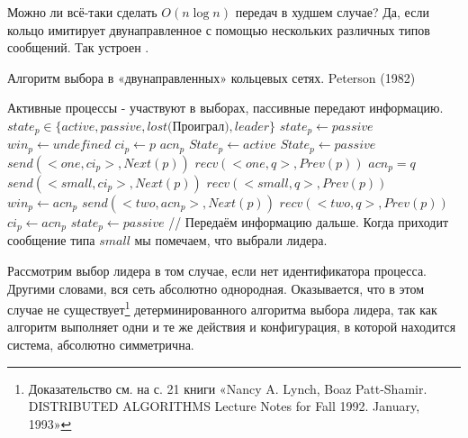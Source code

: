 Можно ли всё-таки сделать $O(n\log n)$ передач в худшем случае? Да, если кольцо имитирует двунаправленное с помощью нескольких различных типов сообщений. Так устроен .
\begin{algorithm}
\caption{Алгоритм выбора в «двунаправленных» кольцевых сетях. Peterson (1982)}
\label{algPeterson_leader}
\begin{algorithmic}
\State Активные процессы - участвуют в выборах, пассивные передают информацию. 
\State $state_p \in \{active, passive, lost\text{(Проиграл)}, leader\}$ 
\State $state_p \gets passive$
\State $win_p \gets undefined$ 
\State $ci_p \gets p$ 
\State $acn_p$ 
    \State $State_p \gets active$
\Else 
    \State $State_p \gets passive$
\EndIf
{}
    \State $send(<one, ci_p>, Next(p))$ 
    \State $recv(<one, q>, Prev(p))$
    \State $acn_p = q$
     
        \State $send(<small, ci_p>, Next(p))$ 
        \State $recv(<small, q>, Prev(p))$ 
        \State $win_p \gets acn_p$
    \Else {}
        \State $send(<two, acn_p>, Next(p))$
        \State $recv(<two, q>, Prev(p))$
         
            \State $ci_p \gets acn_p$
        \Else 
            \State $state_p \gets passive$ 
        \EndIf
    \EndIf
\EndWhile
{} 
    \State // Передаём информацию дальше.
\EndIf
\State Когда приходит сообщение типа $small$ мы помечаем, что выбрали лидера.
\end{algorithmic}
\end{algorithm}
Рассмотрим выбор лидера в том случае, если нет идентификатора процесса. Другими словами, вся сеть абсолютно однородная. Оказывается, что в этом случае не существует\footnote{Доказательство см. на с. 21 книги «Nancy A. Lynch, Boaz Patt-Shamir. DISTRIBUTED ALGORITHMS Lecture Notes for Fall 1992. January, 1993»} детерминированного алгоритма выбора лидера, так как алгоритм выполняет одни и те же действия и конфигурация, в которой находится система, абсолютно симметрична.

